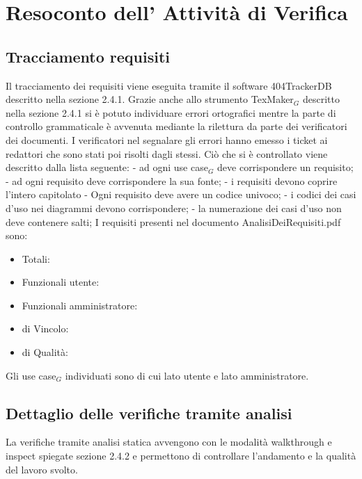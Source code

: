 \section{Resoconto dell' Attività di Verifica}

\subsection{Tracciamento requisiti}
Il tracciamento dei requisiti viene eseguita tramite il software 404TrackerDB descritto nella sezione 2.4.1. 
Grazie anche allo strumento TexMaker$_G$ descritto nella sezione 2.4.1 si è potuto individuare errori ortografici mentre la parte di controllo grammaticale è avvenuta mediante la rilettura da parte dei verificatori dei documenti. I verificatori nel segnalare gli errori hanno emesso i ticket ai redattori che sono stati poi risolti dagli stessi.
Ciò che si è controllato viene descritto dalla lista seguente:
- ad ogni use case$_G$ deve corrispondere un requisito;
- ad ogni requisito deve corrispondere la sua fonte;
- i requisiti devono coprire l'intero capitolato
- Ogni requisito deve avere un codice univoco;
- i codici dei casi d'uso nei diagrammi devono corrispondere;
- la numerazione dei casi d'uso non deve contenere salti;
I requisiti presenti nel documento AnalisiDeiRequisiti.pdf sono:
\begin{itemize}
\item Totali: 
\item Funzionali utente:
\item Funzionali amministratore:
\item di Vincolo:
\item di Qualità:
\end{itemize}
Gli use case$_G$ individuati sono di cui lato utente e lato  amministratore.
\subsection{Dettaglio delle verifiche tramite analisi}
La verifiche tramite analisi statica avvengono con le modalità walkthrough e inspect spiegate sezione 2.4.2 e permettono di controllare l'andamento e la qualità del lavoro svolto.
